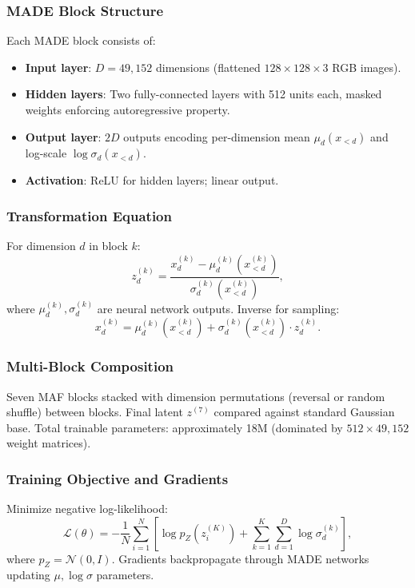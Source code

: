\documentclass[11pt]{article}
\begin{document}
\subsubsection{MADE Block Structure}
Each MADE block consists of:
\begin{itemize}
\item \textbf{Input layer}: $D = 49{,}152$ dimensions (flattened $128 \times 128 \times 3$ RGB images).
\item \textbf{Hidden layers}: Two fully-connected layers with 512 units each, masked weights enforcing autoregressive property.
\item \textbf{Output layer}: $2D$ outputs encoding per-dimension mean $\mu_d(x_{<d})$ and log-scale $\log \sigma_d(x_{<d})$.
\item \textbf{Activation}: ReLU for hidden layers; linear output.
\end{itemize}

\subsubsection{Transformation Equation}
For dimension $d$ in block $k$:
\begin{equation}
z^{(k)}_d = \frac{x^{(k)}_d - \mu^{(k)}_d(x^{(k)}_{<d})}{\sigma^{(k)}_d(x^{(k)}_{<d})},
\end{equation}
where $\mu^{(k)}_d, \sigma^{(k)}_d$ are neural network outputs. Inverse for sampling:
\begin{equation}
x^{(k)}_d = \mu^{(k)}_d(x^{(k)}_{<d}) + \sigma^{(k)}_d(x^{(k)}_{<d}) \cdot z^{(k)}_d.
\end{equation}

\subsubsection{Multi-Block Composition}
Seven MAF blocks stacked with dimension permutations (reversal or random shuffle) between blocks. Final latent $z^{(7)}$ compared against standard Gaussian base. Total trainable parameters: approximately 18M (dominated by $512 \times 49{,}152$ weight matrices).

\subsubsection{Training Objective and Gradients}
Minimize negative log-likelihood:
\begin{equation}
\mathcal{L}(\theta) = -\frac{1}{N} \sum_{i=1}^{N} \left[ \log p_Z(z_i^{(K)}) + \sum_{k=1}^{K} \sum_{d=1}^{D} \log \sigma^{(k)}_d \right],
\end{equation}
where $p_Z = \mathcal{N}(0, I)$. Gradients backpropagate through MADE networks updating $\mu, \log\sigma$ parameters.
\end{document}

